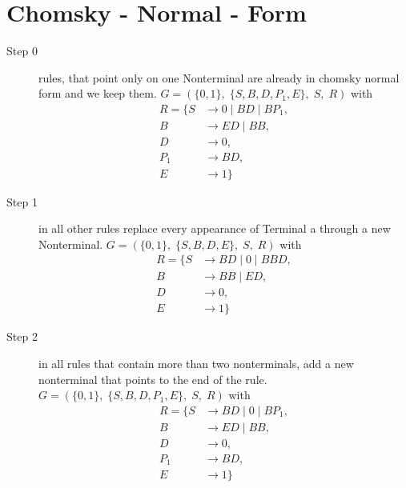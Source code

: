 \documentclass{article}
\begin{document}
\section{Chomsky - Normal - Form}
\begin{description}
	\item[Step 0] rules, that point only on one Nonterminal are already in chomsky normal form and we keep them.
	$G=\left(\{	0, 1\},\;\{ S, B, D, P_1, E\},\;S,\;R\right)$ with
	\begin{align*}
		R=\{	S &\rightarrow 0\;|\;BD\;|\;BP_1, \\ 
		B &\rightarrow ED\;|\;BB, \\ 
		D &\rightarrow 0, \\ 
		P_1 &\rightarrow BD, \\ 
		E &\rightarrow 1\}
	\end{align*}
	\item[Step 1] in all other rules replace every appearance of Terminal a through a new Nonterminal.
	$G=\left(\{	0, 1\},\;\{ S, B, D, E\},\;S,\;R\right)$ with
	\begin{align*}
		R=\{	S &\rightarrow BD\;|\;0\;|\;BBD, \\ 
		B &\rightarrow BB\;|\;ED, \\ 
		D &\rightarrow 0, \\ 
		E &\rightarrow 1\}
	\end{align*}
	\item[Step 2] in all rules that contain more than two nonterminals, add a new nonterminal that points to the end of the rule.
	$G=\left(\{	0, 1\},\;\{ S, B, D, P_1, E\},\;S,\;R\right)$ with
	\begin{align*}
		R=\{	S &\rightarrow BD\;|\;0\;|\;BP_1, \\ 
		B &\rightarrow ED\;|\;BB, \\ 
		D &\rightarrow 0, \\ 
		P_1 &\rightarrow BD, \\ 
		E &\rightarrow 1\}
	\end{align*}
\end{description}
\end{document}
